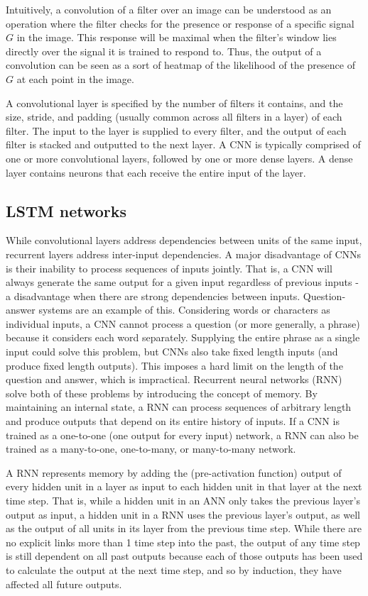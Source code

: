 \documentclass{article} %
\begin{document}
Intuitively, a convolution of a filter over an image can be understood as an operation where the filter checks for the presence or response of a specific signal $G$ in the image. This response will be maximal when the filter's window lies directly over the signal it is trained to respond to. Thus, the output of a convolution can be seen as a sort of heatmap of the likelihood of the presence of $G$ at each point in the image. 

A convolutional layer is specified by the number of filters it contains, and the size, stride, and padding (usually common across all filters in a layer) of each filter. The input to the layer is supplied to every filter, and the output of each filter is stacked and outputted to the next layer. A CNN is typically comprised of one or more convolutional layers, followed by one or more dense layers. A dense layer contains neurons that each receive the entire input of the layer.

\subsection{LSTM networks}

While convolutional layers address dependencies between units of the same input, recurrent layers address inter-input dependencies. A major disadvantage of CNNs is their inability to process sequences of inputs jointly. That is, a CNN will always generate the same output for a given input regardless of previous inputs - a disadvantage when there are strong dependencies between inputs. Question-answer systems are an example of this. Considering words or characters as individual inputs, a CNN cannot process a question (or more generally, a phrase) because it considers each word separately. Supplying the entire phrase as a single input could solve this problem, but CNNs also take fixed length inputs (and produce fixed length outputs). This imposes a hard limit on the length of the question and answer, which is impractical. Recurrent neural networks (RNN) solve both of these problems by introducing the concept of memory. By maintaining an internal state, a RNN can process sequences of arbitrary length and produce outputs that depend on its entire history of inputs. If a CNN is trained as a one-to-one (one output for every input) network, a RNN can also be trained as a many-to-one, one-to-many, or many-to-many network.

A RNN represents memory by adding the (pre-activation function) output of every hidden unit in a layer as input to each hidden unit in that layer at the next time step. That is, while a hidden unit in an ANN only takes the previous layer's output as input, a hidden unit in a RNN uses the previous layer's output, as well as the output of all units in its layer from the previous time step. While there are no explicit links more than 1 time step into the past, the output of any time step is still dependent on all past outputs because each of those outputs has been used to calculate the output at the next time step, and so by induction, they have affected all future outputs.
\end{document}
